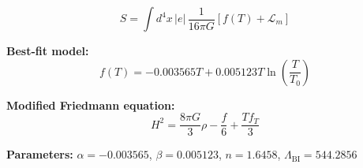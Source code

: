 
\begin{equation}
  S = \int d^4x \, |e| \, \frac{1}{16\pi G} \left[ f(T) + \mathcal{L}_m \right]
\end{equation}

\textbf{Best-fit model:}
\begin{equation}
  f(T) = -0.003565 T + 0.005123 T \ln\!\left(\frac{T}{T_0}\right)
\end{equation}

\textbf{Modified Friedmann equation:}
\begin{equation}
  H^2 = \frac{8\pi G}{3} \rho - \frac{f}{6} + \frac{T f_T}{3}
\end{equation}

\textbf{Parameters:}
$\alpha = -0.003565$, \quad
$\beta = 0.005123$, \quad
$n = 1.6458$, \quad
$\Lambda_{\text{BI}} = 544.2856$